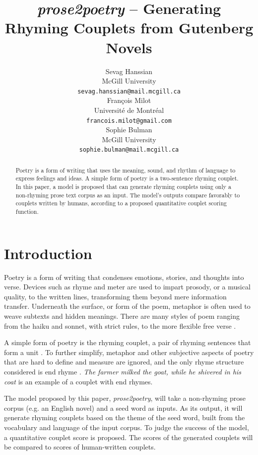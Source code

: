 \documentclass[11pt,a4paper]{article}
\title{\textit{prose2poetry} -- Generating Rhyming Couplets from Gutenberg Novels}
\author{Sevag Hanssian \\
  McGill University \\
 \texttt{sevag.hanssian@mail.mcgill.ca}\\\And
  François Milot \\
  Université de Montréal \\
  \texttt{francois.milot@gmail.com}\\\AND Sophie Bulman \\
  McGill University \\
   \texttt{sophie.bulman@mail.mcgill.ca}}
\date{}
\begin{document}
\maketitle
\begin{abstract}
	Poetry is a form of writing that uses the meaning, sound, and rhythm of language to express feelings and ideas. A simple form of poetry is a two-sentence rhyming couplet. In this paper, a model is proposed that can generate rhyming couplets using only a non-rhyming prose text corpus as an input. The model's outputs compare favorably to couplets written by humans, according to a proposed quantitative couplet scoring function.
\end{abstract}

\section{Introduction}
\label{sec:intro}

Poetry is a form of writing that condenses emotions, stories, and thoughts into verse. Devices such as rhyme and meter are used to impart prosody, or a musical quality, to the written lines, transforming them beyond mere information transfer. Underneath the surface, or form of the poem, metaphor is often used to weave subtexts and hidden meanings. There are many styles of poem ranging from the haiku and sonnet, with strict rules, to the more flexible free verse \citep{poem_type}.

A simple form of poetry is the rhyming couplet, a pair of rhyming sentences that form a unit \cite{couplet_def}. To further simplify, metaphor and other subjective aspects of poetry that are hard to define and measure are ignored, and the only rhyme structure considered is end rhyme \cite{end_rhyme_def}. \textit{The farmer milked the goat, while he shivered in his coat} is an example of a couplet with end rhymes.

The model proposed by this paper, \textit{prose2poetry}, will take a non-rhyming prose corpus (e.g. an English novel) and a seed word as inputs. As its output, it will generate rhyming couplets based on the theme of the seed word, built from the vocabulary and language of the input corpus. To judge the success of the model, a quantitative couplet score is proposed. The scores of the generated couplets will be compared to scores of human-written couplets.

\end{document}
